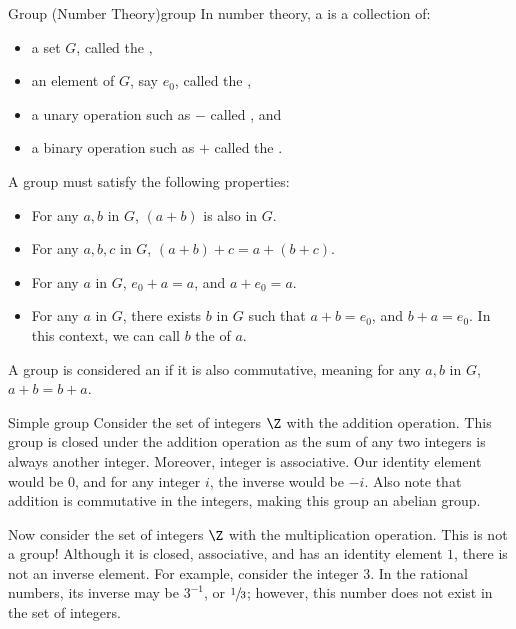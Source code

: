 \begin{dfnbox}{Group (Number Theory)}{group}
    In number theory, a  is a collection of:
    \begin{itemize}[noitemsep]
        \item a set $G$, called the ,
        \item an element of $G$, say $e_0$, called the ,
        \item a unary operation such as $-$ called , and
        \item a binary operation such as $+$ called the .
    \end{itemize}
    A group must satisfy the following properties:
    \begin{itemize}
        \item {} For any $a,b$ in $G$, $(a + b)$ is also in $G$.
        \item {} For any $a,b,c$ in $G$, $(a+b) + c = a + (b+c)$.
        \item {} For any $a$ in $G$, $e_0 + a = a$, and $a + e_0 = a$.
        \item {} For any $a$ in $G$, there exists $b$ in $G$ such that $a + b = e_0$, and $b + a = e_0$. In this context, we can call $b$ the  of $a$.
    \end{itemize}
    A group is considered an  if it is also commutative, meaning for any $a,b$ in $G$, $a + b = b + a$.
\end{dfnbox}

\begin{exbox}{Simple group}{}
    Consider the set of integers $\Z$ with the addition operation. This group is closed under the addition operation as the sum of any two integers is always another integer. Moreover, integer is associative. Our identity element would be $0$, and for any integer $i$, the inverse would be $-i$. Also note that addition is commutative in the integers, making this group an abelian group.

    Now consider the set of integers $\Z$ with the multiplication operation. This is not a group! Although it is closed, associative, and has an identity element $1$, there is not an inverse element. For example, consider the integer $3$. In the rational numbers, its inverse may be $3^{-1}$, or $\sfrac{1}{3}$; however, this number does not exist in the set of integers.
\end{exbox}

